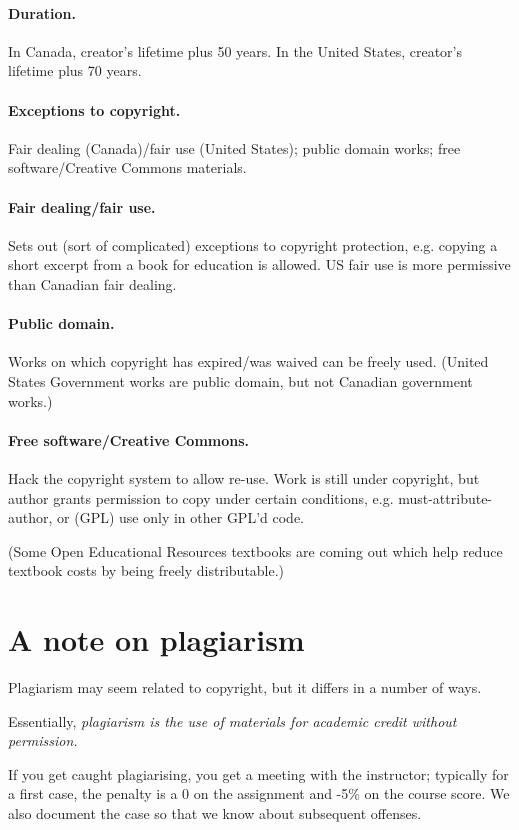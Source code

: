 \documentclass[11pt]{article}
\begin{document}
\paragraph{Duration.} In Canada, creator's lifetime plus 50 years. In the United States, creator's
lifetime plus 70 years.

\paragraph{Exceptions to copyright.} Fair dealing (Canada)/fair use (United States); public domain works; free software/Creative Commons materials.

\paragraph{Fair dealing/fair use.} Sets out (sort of complicated) exceptions to copyright protection, e.g. copying a short excerpt from a book for education is allowed. US fair use is more permissive than Canadian fair dealing.

\paragraph{Public domain.} Works on which copyright has expired/was waived can be freely used. (United States Government works are public domain, but not Canadian government works.)

\paragraph{Free software/Creative Commons.} Hack the copyright system to allow re-use. Work is still under copyright, but author grants permission to copy under certain conditions, e.g. must-attribute-author, or (GPL) use only in other GPL'd code.

\noindent (Some Open Educational Resources textbooks are coming out which help reduce textbook costs by being freely distributable.)

\section*{A note on plagiarism}
Plagiarism may seem related to copyright, but it differs in a number of ways.

Essentially, \emph{plagiarism is the use of materials for academic credit without permission.}

If you get caught plagiarising, you get a meeting with the instructor; typically for a first
case, the penalty is a 0 on the assignment and -5\% on the course score. We also document
the case so that we know about subsequent offenses.
\end{document}

